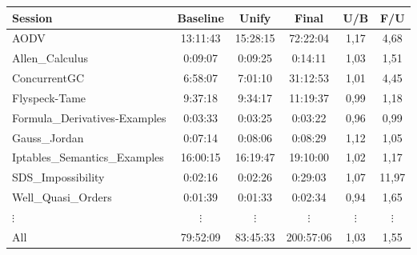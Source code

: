 \begin{frame}
\scriptsize
\begin{center}
\begin{tabular}{l *{5}{c}}
Session & Baseline & Unify & Final & U/B & F/U\\ \hline
AODV & 13:11:43 & 15:28:15 & 72:22:04 & 1,17 & 4,68\\
Allen\_Calculus & 0:09:07 & 0:09:25 & 0:14:11 & 1,03 & 1,51\\
ConcurrentGC & 6:58:07 & 7:01:10 & 31:12:53 & 1,01 & 4,45\\
Flyspeck-Tame & 9:37:18 & 9:34:17 & 11:19:37 & 0,99 & 1,18\\
Formula\_Derivatives-Examples & 0:03:33 & 0:03:25 & 0:03:22 & 0,96 & 0,99\\
Gauss\_Jordan & 0:07:14 & 0:08:06 & 0:08:29 & 1,12 & 1,05\\
Iptables\_Semantics\_Examples & 16:00:15 & 16:19:47 & 19:10:00 & 1,02 & 1,17\\
SDS\_Impossibility & 0:02:16 & 0:02:26 & 0:29:03 & 1,07 & 11,97\\
Well\_Quasi\_Orders & 0:01:39 & 0:01:33 & 0:02:34 & 0,94 & 1,65\\
$\vdots$ & $\vdots$ & $\vdots$ & $\vdots$ & $\vdots$ & $\vdots$\\
\hline\hline
All & 79:52:09 & 83:45:33 & 200:57:06 & 1,03 & 1,55\\
\end{tabular}
\end{center}
\end{frame}

\begin{frame}[fragile]
\end{frame}
